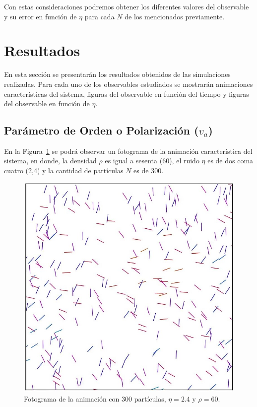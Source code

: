 \documentclass[11pt, a4paper]{article}
\begin{document}
            Con estas consideraciones podremos obtener los diferentes valores del observable y su error en función de $\eta$
            para cada $N$ de los mencionados previamente.

    \newpage

    \section{Resultados}
    \label{sec:resultados}

        En esta sección se presentarán los resultados obtenidos de las simulaciones realizadas.
        Para cada uno de los observables estudiados se mostrarán animaciones características del sistema,
        figuras del observable en función del tiempo y figuras del observable en función de $\eta$.

        \subsection{Parámetro de Orden o Polarización ($v_a$)}
        \label{subsec:resultados-polarizacion}

            En la Figura~\ref{fig:parametro_orden_1} se podrá observar un fotograma de la animación característica del sistema, en donde,
            la densidad $\rho$ es igual a sesenta (60), el ruido $\eta$ es de dos coma cuatro (2,4) y la cantidad de partículas $N$ es de 300.

            \begin{figure}[H]
                \centering
                \includegraphics[width=\textwidth]{./animation-n300-eta2p4-frame}
                \caption{Fotograma de la animación con 300 partículas, $\eta = 2.4$ y $\rho = 60$.}
                \label{fig:parametro_orden_1}
            \end{figure}
\end{document}
